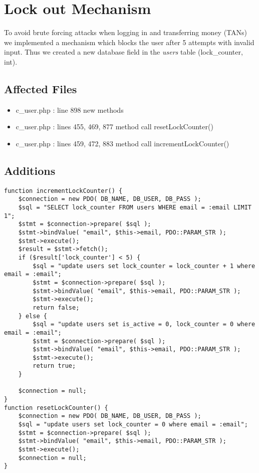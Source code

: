 \chapter{Lock out Mechanism}

To avoid brute forcing attacks when logging in and transferring money (TANs) we implemented a mechanism which blocks the user after 5 attempts with invalid input. Thus we created a new database field in the \textit{users} table (lock\_counter, int). 

\section{Affected Files}
\begin{itemize}
	\item c\_user.php : line 898 new methods
	\item c\_user.php : lines 455, 469, 877  method call resetLockCounter()
	\item c\_user.php : lines 459, 472, 883  method call incrementLockCounter()
\end{itemize}

\section{Additions}

\begin{lstlisting}[caption = New methods]
function incrementLockCounter() {
	$connection = new PDO( DB_NAME, DB_USER, DB_PASS );
	$sql = "SELECT lock_counter FROM users WHERE email = :email LIMIT 1";
	$stmt = $connection->prepare( $sql );
	$stmt->bindValue( "email", $this->email, PDO::PARAM_STR );
	$stmt->execute();
	$result = $stmt->fetch();
	if ($result['lock_counter'] < 5) {
		$sql = "update users set lock_counter = lock_counter + 1 where email = :email";
		$stmt = $connection->prepare( $sql );
		$stmt->bindValue( "email", $this->email, PDO::PARAM_STR );
		$stmt->execute();
		return false;
	} else {
		$sql = "update users set is_active = 0, lock_counter = 0 where email = :email";
		$stmt = $connection->prepare( $sql );
		$stmt->bindValue( "email", $this->email, PDO::PARAM_STR );
		$stmt->execute();
		return true;
	}
	
	$connection = null;
}
function resetLockCounter() {
	$connection = new PDO( DB_NAME, DB_USER, DB_PASS );
	$sql = "update users set lock_counter = 0 where email = :email";
	$stmt = $connection->prepare( $sql );
	$stmt->bindValue( "email", $this->email, PDO::PARAM_STR );
	$stmt->execute();
	$connection = null;
}
\end{lstlisting}